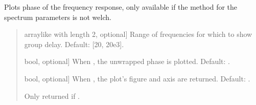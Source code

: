 \documentclass[letterpaper,10pt,english]{sphinxmanual}
\begin{document}
\begin{fulllineitems}
\begin{fulllineitems}
\label{\detokenize{classes:dsptools.classes.signal_class.Signal.plot_phase}}
\pysigstartsignatures
{}
\pysigstopsignatures
\sphinxAtStartPar
Plots phase of the frequency response, only available if the method
for the spectrum parameters is not welch.
\begin{quote}\begin{description}
\begin{description}
\sphinxlineitem{\sphinxstylestrong{range\_hz}}{[}array\sphinxhyphen{}like with length 2, optional{]}
\sphinxAtStartPar
Range of frequencies for which to show group delay.
Default: {[}20, 20e3{]}.

\sphinxlineitem{\sphinxstylestrong{unwrap}}{[}bool, optional{]}
\sphinxAtStartPar
When , the unwrapped phase is plotted. Default: .

\sphinxlineitem{\sphinxstylestrong{returns}}{[}bool, optional{]}
\sphinxAtStartPar
When , the plot’s figure and axis are returned.
Default: .

\end{description}

\begin{description}
\sphinxAtStartPar
Only returned if .

\end{description}

\end{description}\end{quote}

\end{fulllineitems}



\end{fulllineitems}
\end{document}
